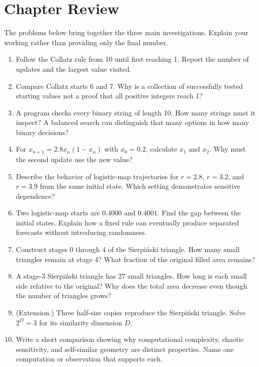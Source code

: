 \section*{Chapter Review}
The problems below bring together the three main investigations. Explain your working rather than providing only the final number.
\begin{enumerate}
\item Follow the Collatz rule from 10 until first reaching 1. Report the number of updates and the largest value visited.
\item Compare Collatz starts 6 and 7. Why is a collection of successfully tested starting values not a proof that all positive integers reach 1?
\item A program checks every binary string of length 10. How many strings must it inspect? A balanced search can distinguish that many options in how many binary decisions?
\item For $x_{n+1}=2.8x_n(1-x_n)$ with $x_0=0.2$, calculate $x_1$ and $x_2$. Why must the second update use the new value?
\item Describe the behavior of logistic-map trajectories for $r=2.8$, $r=3.2$, and $r=3.9$ from the same initial state. Which setting demonstrates sensitive dependence?
\item Two logistic-map starts are $0.4000$ and $0.4001$. Find the gap between the initial states. Explain how a fixed rule can eventually produce separated forecasts without introducing randomness.
\item Construct stages 0 through 4 of the Sierpi\'nski triangle. How many small triangles remain at stage 4? What fraction of the original filled area remains?
\item A stage-3 Sierpi\'nski triangle has 27 small triangles. How long is each small side relative to the original? Why does the total area decrease even though the number of triangles grows?
\item (Extension.) Three half-size copies reproduce the Sierpi\'nski triangle. Solve $2^D=3$ for its similarity dimension $D$.
\item Write a short comparison showing why computational complexity, chaotic sensitivity, and self-similar geometry are distinct properties. Name one computation or observation that supports each.
\end{enumerate}
